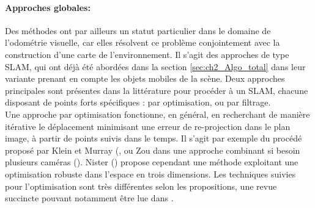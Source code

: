 \paragraph{Approches globales:\\}
Des méthodes ont par ailleurs un statut particulier dans le domaine de l'odométrie visuelle, car elles résolvent ce problème conjointement avec la construction d'une carte de l'environnement. Il s'agit des approches de type SLAM, qui ont déjà été abordées dans la section \ref{sec:ch2_Algo_total} dans leur variante prenant en compte les objets mobiles de la scène. Deux approches principales sont présentes dans la littérature pour procéder à un SLAM, chacune disposant de points forts spécifiques : par optimisation, ou par filtrage.\\
Une approche par optimisation fonctionne, en général, en recherchant de manière itérative le déplacement minimisant une erreur de re-projection dans le plan image, à partir de points suivis dans le temps. Il s'agit par exemple du procédé proposé par Klein et Murray (\cite{Klein2007}, ou Zou dans une approche combinant si besoin plusieurs caméras (\cite{Zou}). Nister  (\cite{Nister2006}) propose cependant une méthode exploitant une optimisation robuste dans l'espace en trois dimensions. Les techniques suivies pour l'optimisation sont très différentes selon les propositions, une revue succincte pouvant notamment être lue dans \cite{Madsen2004}.\\

